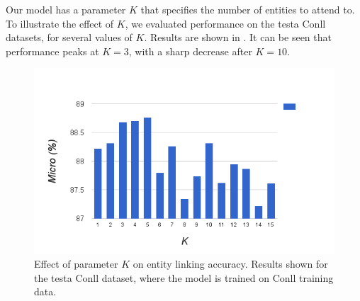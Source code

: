 Our model has a parameter $K$ that specifies the number of entities to attend to. To illustrate
the effect of $K$, we evaluated performance on the testa Conll datasets, for several values of $K$. Results 
are shown in . It can be seen that performance peaks at $K=3$, with a sharp decrease after $K=10$. 

\begin{figure}
\includegraphics[width=\linewidth]{./k_effect.png}
\caption{Effect of parameter $K$ on entity linking accuracy. Results shown for the testa Conll dataset, where the model
is trained on Conll training data. }
\label{fig:k_effect}
\end{figure}